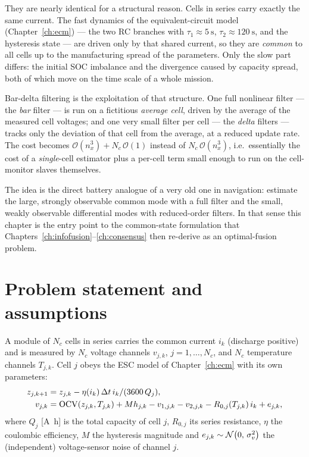 They are nearly identical for a structural reason. Cells in series carry exactly the same
current. The fast dynamics of the equivalent-circuit model (Chapter~\ref{ch:ecm}) --- the two RC
branches with $\tau_1\approx\SI{5}{\second}$, $\tau_2\approx\SI{120}{\second}$, and the
hysteresis state --- are driven only by that shared current, so they are \emph{common} to all
cells up to the manufacturing spread of the parameters. Only the slow part differs: the initial
SOC imbalance and the divergence caused by capacity spread, both of which move on the time scale
of a whole mission.

Bar-delta filtering \cite{plett2009bardelta,plett2016bms2} is the exploitation of that structure.
One full nonlinear filter --- the \emph{bar} filter --- is run on a fictitious \emph{average
cell}, driven by the average of the measured cell voltages; and one very small filter per cell
--- the \emph{delta} filters --- tracks only the deviation of that cell from the average, at a
reduced update rate. The cost becomes $\mathcal{O}(n_x^3) + N_c\,\mathcal{O}(1)$ instead of
$N_c\,\mathcal{O}(n_x^3)$, i.e.\ essentially the cost of a \emph{single}-cell estimator plus a
per-cell term small enough to run on the cell-monitor slaves themselves.

The idea is the direct battery analogue of a very old one in navigation: estimate the large,
strongly observable common mode with a full filter and the small, weakly observable differential
modes with reduced-order filters. In that sense this chapter is the entry point to the
common-state formulation that Chapters~\ref{ch:infofusion}--\ref{ch:consensus} then re-derive as
an optimal-fusion problem.

\section{Problem statement and assumptions}
A module of $N_c$ cells in series carries the common current $i_k$ (discharge positive) and is
measured by $N_c$ voltage channels $v_{j,k}$, $j=1,\dots,N_c$, and $N_c$ temperature channels
$T_{j,k}$. Cell $j$ obeys the ESC model of Chapter~\ref{ch:ecm} with its own parameters:
\begin{align}
z_{j,k+1} &= z_{j,k} - \eta(i_k)\,\Delta t\,i_k/(3600\,Q_j), \label{eq:bd-cellz}\\
v_{j,k} &= \mathrm{OCV}(z_{j,k},T_{j,k}) + M h_{j,k} - v_{1,j,k} - v_{2,j,k} - R_{0,j}(T_{j,k})\,i_k + e_{j,k},
\label{eq:bd-cellv}
\end{align}
where $Q_j$ [\si{\ampere\hour}] is the total capacity of cell $j$, $R_{0,j}$ its series
resistance, $\eta$ the coulombic efficiency, $M$ the hysteresis magnitude and
$e_{j,k}\sim\mathcal{N}\!\left(0,\,\sigma_v^2\right)$ the (independent) voltage-sensor noise of channel $j$.

